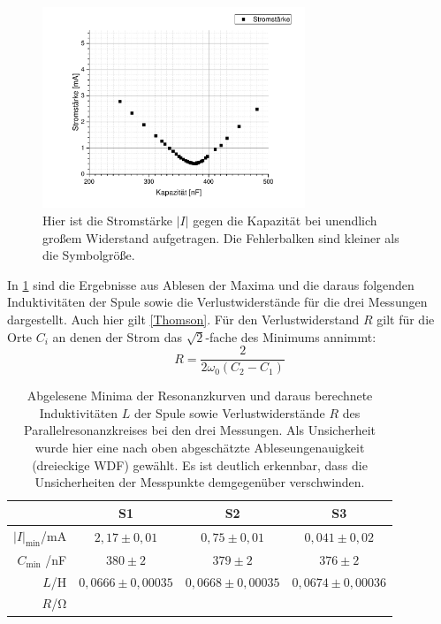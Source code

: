 \documentclass[
	a4paper,
	12pt,
	pagesize,
	ngerman
]{scrartcl}
\begin{document}
	\begin{figure}[H]
		\includegraphics[width=0.7\textwidth]{Parallelstromkreis_inf}
		\centering
		\caption{Hier ist die Stromstärke $ \left| I \right| $ gegen die Kapazität bei unendlich großem Widerstand aufgetragen. Die Fehlerbalken sind kleiner als die Symbolgröße.}
		\label{Para_inf}
		\centering
	\end{figure}
	
	In \cref{Para_Erg} sind die Ergebnisse aus Ablesen der Maxima und die daraus folgenden Induktivitäten der Spule sowie die Verlustwiderstände für die drei Messungen dargestellt.
	Auch hier gilt \cref{Thomson}.
	Für den Verlustwiderstand $R$ gilt für die Orte $C_i$ an denen der Strom das $ \sqrt{2} $-fache des Minimums annimmt:
	\begin{equation}
	R= \frac{2}{2\omega_0 \left( C_2 - C_1 \right)}
	\end{equation}
	
	\begin{table}[H]
		\centering
		\begin{tabular}{ r | c | c | c }
			&S1 & S2 & S3 \\ \hline
			$  \left| I \right|_\text{min}$/\si{mA} & $2,17\pm 0,01$ &$0,75\pm 0,01$ & $0,041\pm 0,02$\\ 
			$C_\text{min}$ /\si{nF} &$380\pm2$&$379\pm2$&$376\pm2$\\
			$L$/\si{\henry} & $0,0666\pm 0,00035$ & $0,0668 \pm 0,00035$ & $0,0674\pm 0,00036$\\
			$R$/\si{\ohm} & & & \\
		\end{tabular}
		\caption{Abgelesene Minima der Resonanzkurven und daraus berechnete Induktivitäten $L$ der Spule sowie Verlustwiderstände $R$ des Parallelresonanzkreises bei den drei Messungen. Als Unsicherheit wurde hier eine nach oben abgeschätzte Ableseungenauigkeit (dreieckige WDF) gewählt. Es ist deutlich erkennbar, dass die Unsicherheiten der Messpunkte demgegenüber verschwinden.}
		\label{Para_Erg} 
	\end{table}
\end{document}
